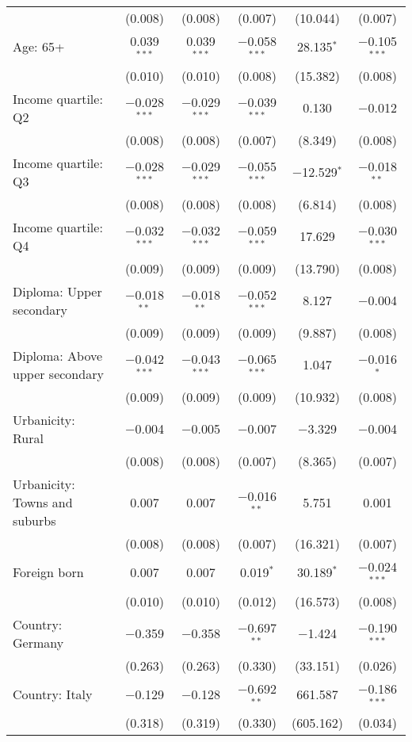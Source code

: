 \begin{tabular}{@{\extracolsep{5pt}}lccccc}
  & (0.008) & (0.008) & (0.007) & (10.044) & (0.007) \\ 
  Age: 65+ & 0.039$^{***}$ & 0.039$^{***}$ & $-$0.058$^{***}$ & 28.135$^{*}$ & $-$0.105$^{***}$ \\ 
  & (0.010) & (0.010) & (0.008) & (15.382) & (0.008) \\ 
  Income quartile: Q2 & $-$0.028$^{***}$ & $-$0.029$^{***}$ & $-$0.039$^{***}$ & 0.130 & $-$0.012 \\ 
  & (0.008) & (0.008) & (0.007) & (8.349) & (0.008) \\ 
  Income quartile: Q3 & $-$0.028$^{***}$ & $-$0.029$^{***}$ & $-$0.055$^{***}$ & $-$12.529$^{*}$ & $-$0.018$^{**}$ \\ 
  & (0.008) & (0.008) & (0.008) & (6.814) & (0.008) \\ 
  Income quartile: Q4 & $-$0.032$^{***}$ & $-$0.032$^{***}$ & $-$0.059$^{***}$ & 17.629 & $-$0.030$^{***}$ \\ 
  & (0.009) & (0.009) & (0.009) & (13.790) & (0.008) \\ 
  Diploma: Upper secondary & $-$0.018$^{**}$ & $-$0.018$^{**}$ & $-$0.052$^{***}$ & 8.127 & $-$0.004 \\ 
  & (0.009) & (0.009) & (0.009) & (9.887) & (0.008) \\ 
  Diploma: Above upper secondary & $-$0.042$^{***}$ & $-$0.043$^{***}$ & $-$0.065$^{***}$ & 1.047 & $-$0.016$^{*}$ \\ 
  & (0.009) & (0.009) & (0.009) & (10.932) & (0.008) \\ 
  Urbanicity: Rural & $-$0.004 & $-$0.005 & $-$0.007 & $-$3.329 & $-$0.004 \\ 
  & (0.008) & (0.008) & (0.007) & (8.365) & (0.007) \\ 
  Urbanicity: Towns and suburbs & 0.007 & 0.007 & $-$0.016$^{**}$ & 5.751 & 0.001 \\ 
  & (0.008) & (0.008) & (0.007) & (16.321) & (0.007) \\ 
  Foreign born & 0.007 & 0.007 & 0.019$^{*}$ & 30.189$^{*}$ & $-$0.024$^{***}$ \\ 
  & (0.010) & (0.010) & (0.012) & (16.573) & (0.008) \\ 
  Country: Germany & $-$0.359 & $-$0.358 & $-$0.697$^{**}$ & $-$1.424 & $-$0.190$^{***}$ \\ 
  & (0.263) & (0.263) & (0.330) & (33.151) & (0.026) \\ 
  Country: Italy & $-$0.129 & $-$0.128 & $-$0.692$^{**}$ & 661.587 & $-$0.186$^{***}$ \\ 
  & (0.318) & (0.319) & (0.330) & (605.162) & (0.034) \\ 

\end{tabular}
